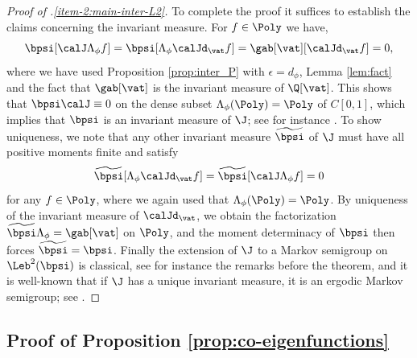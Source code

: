 \begin{proof}[Proof of .\eqref{item-2:main-inter-L2}]

To complete the proof it suffices to establish the claims concerning the invariant measure. For $f \in \Poly$ we have,
\[
\bpsi[\calJ \Lambda_{\phi}f] = \bpsi[\Lambda_{\phi}\calJd_{\vat} f] =\gab[\vat] [\calJd_{\vat} f] = 0,
\]
where we have used Proposition \ref{prop:inter_P} with $\epsilon = d_\phi$, Lemma \ref{lem:fact} and the fact that $\gab[\vat]$ is the invariant measure of $\Q[\vat]$. This shows that $\bpsi \calJ \equiv 0$ on the dense subset $\Lambda_{\phi}(\Poly)=\Poly$ of $C[0,1]$, which implies that $\bpsi$ is an invariant measure of $\J$; see for instance \cite[\S 1.4.1]{Bakry_Book}. To show uniqueness, we note that any other invariant measure $\widetilde{\bpsi}$ of $\J$ must have all positive moments finite and satisfy
\begin{equation*}
\widetilde{\bpsi} [ \Lambda_{\phi} \calJd_{\vat} f ] =\widetilde{\bpsi} [ \calJ \Lambda_\phi f ] = 0
\end{equation*}
for any $f \in \Poly$, where we again used that $\Lambda_\phi(\Poly) = \Poly$. By uniqueness of the invariant measure of $\calJd_{\vat}$, we obtain the factorization $\widetilde{\bpsi} \Lambda_{\phi} = \gab[\vat]$ on $\Poly$, and the moment determinacy of $\bpsi$ then forces $\widetilde{\bpsi} = \bpsi$. Finally the extension of $\J$ to a Markov semigroup on $\Leb^2(\bpsi)$ is classical, see for instance the remarks before the theorem, and it is well-known that if $\J$ has a unique invariant measure, it is an ergodic Markov semigroup; see \eg \cite[Th.\,5.16]{da-prato:2006}.
\end{proof}

\subsection{Proof of Proposition \ref{prop:co-eigenfunctions}}

